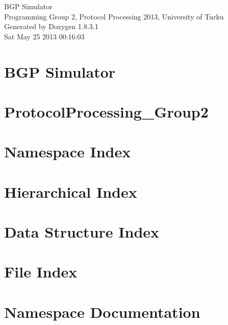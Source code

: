 \documentclass{book}
\begin{document}
\hypersetup{pageanchor=false,citecolor=blue}
\begin{titlepage}
\vspace*{7cm}
\begin{center}
{\Large B\-G\-P Simulator \\[1ex]\large Programming Group 2, Protocol Processing 2013, University of Turku }\\
\vspace*{1cm}
{\large Generated by Doxygen 1.8.3.1}\\
\vspace*{0.5cm}
{\small Sat May 25 2013 00:16:03}\\
\end{center}
\end{titlepage}
\clearemptydoublepage
{}
\tableofcontents
\clearemptydoublepage
{}
\hypersetup{pageanchor=true,citecolor=blue}
\chapter{B\-G\-P Simulator}
\label{index}\hypertarget{index}{}
\chapter{Protocol\-Processing\-\_\-\-Group2}
\label{md_README}
\hypertarget{md_README}{}

\chapter{Namespace Index}

\chapter{Hierarchical Index}

\chapter{Data Structure Index}

\chapter{File Index}

\chapter{Namespace Documentation}


\end{document}

